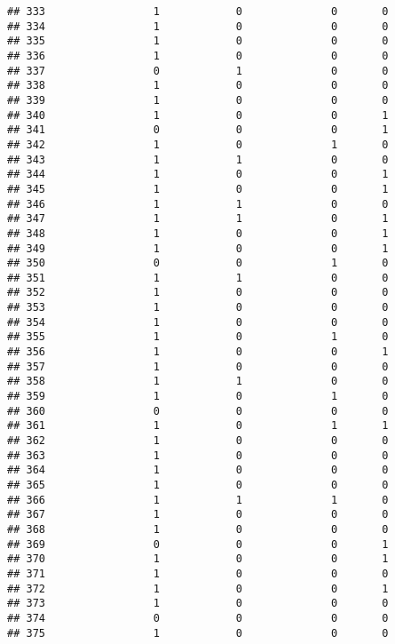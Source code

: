 \documentclass[]{article}
\begin{document}
\begin{verbatim}
## 333                 1            0              0       0
## 334                 1            0              0       0
## 335                 1            0              0       0
## 336                 1            0              0       0
## 337                 0            1              0       0
## 338                 1            0              0       0
## 339                 1            0              0       0
## 340                 1            0              0       1
## 341                 0            0              0       1
## 342                 1            0              1       0
## 343                 1            1              0       0
## 344                 1            0              0       1
## 345                 1            0              0       1
## 346                 1            1              0       0
## 347                 1            1              0       1
## 348                 1            0              0       1
## 349                 1            0              0       1
## 350                 0            0              1       0
## 351                 1            1              0       0
## 352                 1            0              0       0
## 353                 1            0              0       0
## 354                 1            0              0       0
## 355                 1            0              1       0
## 356                 1            0              0       1
## 357                 1            0              0       0
## 358                 1            1              0       0
## 359                 1            0              1       0
## 360                 0            0              0       0
## 361                 1            0              1       1
## 362                 1            0              0       0
## 363                 1            0              0       0
## 364                 1            0              0       0
## 365                 1            0              0       0
## 366                 1            1              1       0
## 367                 1            0              0       0
## 368                 1            0              0       0
## 369                 0            0              0       1
## 370                 1            0              0       1
## 371                 1            0              0       0
## 372                 1            0              0       1
## 373                 1            0              0       0
## 374                 0            0              0       0
## 375                 1            0              0       0

\end{verbatim}
\end{document}
